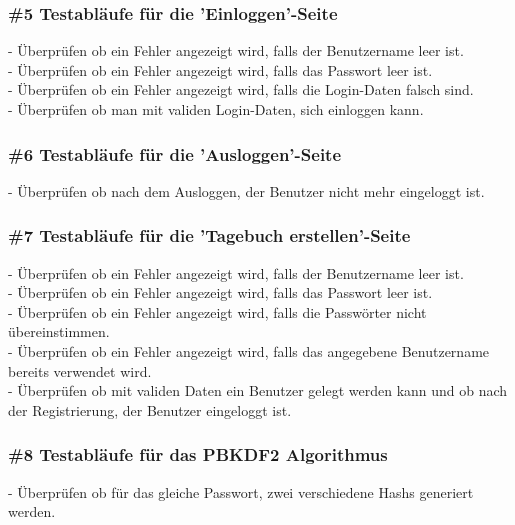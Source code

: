\subsubsection*{\#5 Testabläufe für die 'Einloggen'-Seite}
- Überprüfen ob ein Fehler angezeigt wird, falls der Benutzername leer ist.\\
- Überprüfen ob ein Fehler angezeigt wird, falls das Passwort leer ist.\\
- Überprüfen ob ein Fehler angezeigt wird, falls die Login-Daten falsch sind.\\
- Überprüfen ob man mit validen Login-Daten, sich einloggen kann.

\subsubsection*{\#6 Testabläufe für die 'Ausloggen'-Seite}
- Überprüfen ob nach dem Ausloggen, der Benutzer nicht mehr eingeloggt ist.

\subsubsection*{\#7 Testabläufe für die 'Tagebuch erstellen'-Seite}
- Überprüfen ob ein Fehler angezeigt wird, falls der Benutzername leer ist.\\
- Überprüfen ob ein Fehler angezeigt wird, falls das Passwort leer ist.\\
- Überprüfen ob ein Fehler angezeigt wird, falls die Passwörter nicht übereinstimmen.\\
- Überprüfen ob ein Fehler angezeigt wird, falls das angegebene Benutzername bereits verwendet wird.\\
- Überprüfen ob mit validen Daten ein Benutzer gelegt werden kann und ob nach der Registrierung, der Benutzer eingeloggt ist.

\subsubsection*{\#8 Testabläufe für das PBKDF2 Algorithmus}
- Überprüfen ob für das gleiche Passwort, zwei verschiedene Hashs generiert werden.

